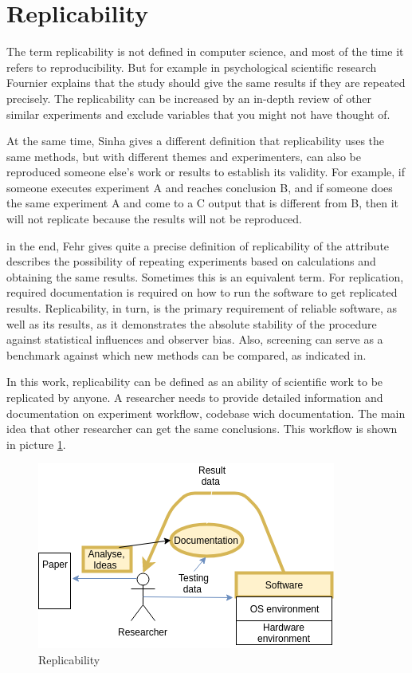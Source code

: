 \section{Replicability}
The term replicability is not defined in computer science, and most of the time it refers to reproducibility. But for example in psychological scientific research Fournier\cite{Four} explains that the study should give the same results if they are repeated precisely. The replicability can be increased by an in-depth review of other similar experiments and exclude variables that you might not have thought of. \par
At the same time, Sinha\cite{For} gives a different definition that replicability uses the same methods, but with different themes and experimenters,  can also be reproduced someone else's work or results to establish its validity. For example, if someone executes experiment A and reaches conclusion B, and if someone does the same experiment A and come to a C output that is different from B, then it will not replicate because the results will not be reproduced. \par
in the end, Fehr\cite{DBLP:journals/corr/FehrHHS16} gives quite a precise definition of replicability of the attribute describes the possibility of repeating experiments based on calculations and obtaining the same results. Sometimes this is an equivalent term. For replication, required documentation is required on how to run the software to get replicated results. Replicability, in turn, is the primary requirement of reliable software, as well as its results, as it demonstrates the absolute stability of the procedure against statistical influences and observer bias. Also, screening can serve as a benchmark against which new methods can be compared, as indicated in. \par
In this work, replicability can be defined as an ability of scientific work to be replicated by anyone. A researcher needs to provide detailed information and documentation on experiment workflow, codebase wich documentation. The main idea that other researcher can get the same conclusions. This workflow is shown in picture \ref{fig:replicability}.\par
\begin{figure}[h!]
  \includegraphics[scale=0.8]{fig/replicability.png}
  \caption{Replicability\cite{gith}}
  \label{fig:replicability}
\end{figure}
